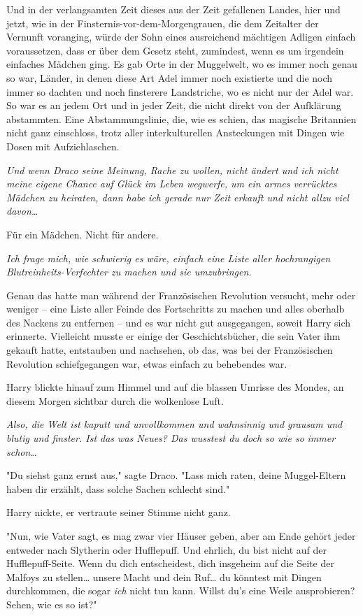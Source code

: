 {Und in der verlangsamten Zeit dieses aus der Zeit gefallenen Landes, hier und jetzt, wie in der Finsternis-vor-dem-Morgengrauen, die dem Zeitalter der Vernunft voranging, würde der Sohn eines ausreichend mächtigen Adligen einfach voraussetzen, dass er über dem Gesetz steht, zumindest, wenn es um irgendein einfaches Mädchen ging. Es gab Orte in der Muggelwelt, wo es immer noch genau so war, Länder, in denen diese Art Adel immer noch existierte und die noch immer so dachten und noch finsterere Landstriche, wo es nicht nur der Adel war. So war es an jedem Ort und in jeder Zeit, die nicht direkt von der Aufklärung abstammten. Eine Abstammungslinie, die, wie es schien, das magische Britannien nicht ganz einschloss, trotz aller interkulturellen Ansteckungen mit Dingen wie Dosen mit Aufziehlaschen.

\emph{Und wenn Draco seine Meinung, Rache zu wollen, nicht ändert und ich nicht meine eigene Chance auf Glück im Leben wegwerfe, um ein armes verrücktes Mädchen zu heiraten, dann habe ich gerade nur Zeit erkauft und nicht allzu viel davon…}

Für ein Mädchen. Nicht für andere.

\emph{Ich frage mich, wie schwierig es wäre, einfach eine Liste aller hochrangigen Blutreinheits-Verfechter zu machen und sie umzubringen.}

Genau das hatte man während der Französischen Revolution versucht, mehr oder weniger -- eine Liste aller Feinde des Fortschritts zu machen und alles oberhalb des Nackens zu entfernen -- und es war nicht gut ausgegangen, soweit Harry sich erinnerte. Vielleicht musste er einige der Geschichtsbücher, die sein Vater ihm gekauft hatte, entstauben und nachsehen, ob das, was bei der Französischen Revolution schiefgegangen war, etwas einfach zu behebendes war.

Harry blickte hinauf zum Himmel und auf die blassen Umrisse des Mondes, an diesem Morgen sichtbar durch die wolkenlose Luft.

\emph{Also, die Welt ist kaputt und unvollkommen und wahnsinnig und grausam und blutig und finster. Ist das was Neues? Das wusstest du doch so wie so} \emph{immer schon…}

"Du siehst ganz ernst aus," sagte Draco. "Lass mich raten, deine Muggel-Eltern haben dir erzählt, dass solche Sachen schlecht sind."

Harry nickte, er vertraute seiner Stimme nicht ganz.

"Nun, wie Vater sagt, es mag zwar vier Häuser geben, aber am Ende gehört jeder entweder nach Slytherin oder Hufflepuff. Und ehrlich, du bist nicht auf der Hufflepuff-Seite. Wenn du dich entscheidest, dich insgeheim auf die Seite der Malfoys zu stellen… unsere Macht und dein Ruf… du könntest mit Dingen durchkommen, die sogar \emph{ich} nicht tun kann. Willst du's eine Weile ausprobieren? Sehen, wie es so ist?"

}
